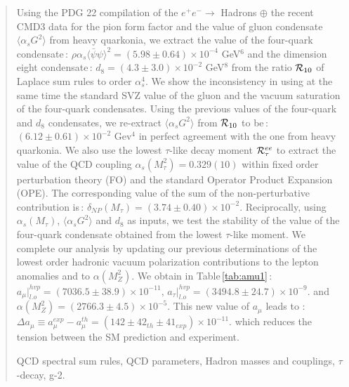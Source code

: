 \documentclass[review]{elsarticle}
\def\la{\langle}
\def\ra{\rangle}
\begin{document}
\begin{frontmatter}
\date{\today}
\begin{abstract}
\noindent
Using the PDG 22 compilation of the $e^+e^-\to$  Hadrons $\oplus$ the recent CMD3 data for the pion form factor and the value of gluon condensate $\la\alpha_s G^2\ra$ from heavy quarkonia, we extract the value of the four-quark condensate\,:  $\rho\alpha_s\la\bar\psi\psi\ra^2= (5.98\pm 0.64)\times 10^{-4}$ GeV$^6$  and 
the dimension eight condensate\,: $d_8= (4.3\pm 3.0)\times 10^{-2}$ GeV$^8$
from the ratio ${\cal R}_{10}$ of Laplace sum rules to order $\alpha_s^4$.  We show the inconsistency in using at the same time the standard SVZ value of the gluon and the vacuum saturation of the four-quark condensates.  Using the previous values of the four-quark and $d_8$ condensates, we re-extract $\la\alpha_s G^2\ra$ from ${\cal R}_{10}$ to be\,:  $(6.12\pm 0.61)\times 10^{-2}$ Gev$^4$ in perfect agreement with the one from heavy quarkonia. We also use
the lowest $\tau$-like decay moment ${\cal R}_\tau^{ee}$ to extract the value of the QCD coupling  $\alpha_s(M^2_\tau)=0.329(10)$ within fixed order perturbation theory (FO) and the standard Operator Product Expansion (OPE). The corresponding value of the sum of the non-perturbative contribution is\,: $\delta_{NP}(M_\tau)=(3.74\pm 0.40)\times 10^{-2}$. Reciprocally, using $\alpha_s(M_\tau)$, $\la\alpha_s G^2\ra$ and $d_8$ as inputs, we test the stability of the value of the four-quark condensate obtained from the lowest $\tau$-like moment. 
We complete our analysis by updating our previous determinations of the lowest order hadronic vacuum polarization  contributions to the lepton anomalies and to $\alpha(M^2_Z)$.  We obtain in Table\,\ref{tab:amu1}\,: $a_\mu\vert^{hvp}_{l.o}= (7036.5\pm 38.9)\times10^{-11}, \, a_\tau\vert^{hvp}_{l.o}= (3494.8\pm 24.7)\times10^{-9} $. and $\alpha(M^2_Z)=(2766.3\pm 4.5)\times 10^{-5}$. This new value of $a_\mu$ leads to : $\Delta a_\mu\equiv a_\mu^{exp}-a_\mu^{th} = (142\pm 42_{th}\pm 41_{exp})\times 10^{-11}$. which reduces the tension between the SM prediction and experiment.
\begin{keyword}  QCD spectral sum rules, QCD parameters,  Hadron masses and couplings, $\tau$-decay, g-2.


\end{keyword}
\end{abstract}
\end{frontmatter}
\newpage
\end{document}

